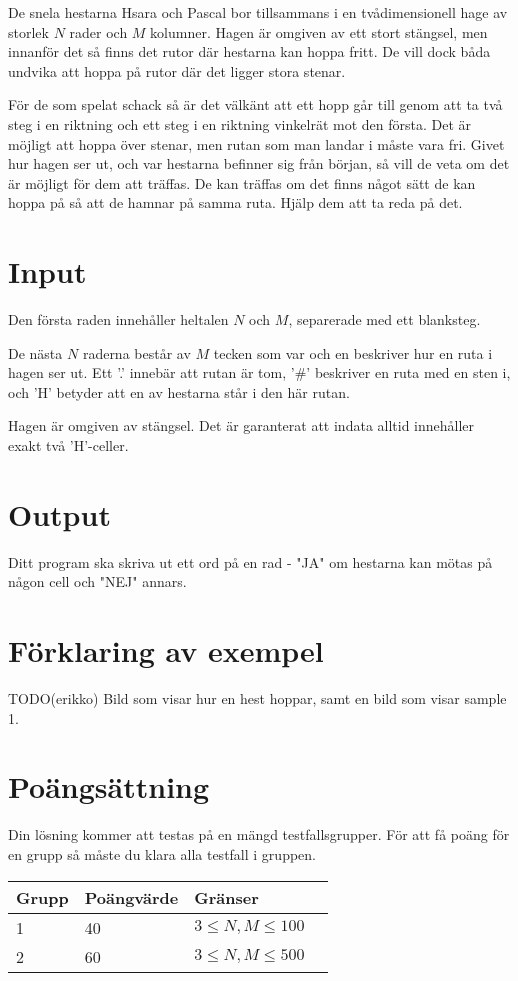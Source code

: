 De snela hestarna Hsara och Pascal bor tillsammans i en tvådimensionell hage av
storlek $N$ rader och $M$ kolumner. Hagen är omgiven av ett stort stängsel, men
innanför det så finns det rutor där hestarna kan hoppa fritt. De vill dock båda
undvika att hoppa på rutor där det ligger stora stenar.

För de som spelat schack så är det välkänt att ett hopp går till genom att ta
två steg i en riktning och ett steg i en riktning vinkelrät mot den första. Det
är möjligt att hoppa över stenar, men rutan som man landar i måste vara fri.
Givet hur hagen ser ut, och var hestarna befinner sig från början, så vill de
veta om det är möjligt för dem att träffas. De kan träffas om det finns något
sätt de kan hoppa på så att de hamnar på samma ruta. Hjälp dem att ta reda på
det.

\section*{Input}
Den första raden innehåller heltalen $N$ och $M$, separerade med ett blanksteg.

De nästa $N$ raderna består av $M$ tecken som var och en beskriver hur en ruta
i hagen ser ut. Ett '.' innebär att rutan är tom, '\#' beskriver en ruta med en
sten i, och 'H' betyder att en av hestarna står i den här rutan.

Hagen är omgiven av stängsel. Det är garanterat att indata alltid innehåller
exakt två 'H'-celler.

\section*{Output}
Ditt program ska skriva ut ett ord på en rad - "JA" om hestarna kan mötas på
någon cell och "NEJ" annars.

\section*{Förklaring av exempel}
TODO(erikko) Bild som visar hur en hest hoppar, samt en bild som visar sample
1.

\section*{Poängsättning}
Din lösning kommer att testas på en mängd testfallsgrupper. För att få poäng
för en grupp så måste du klara alla testfall i gruppen.

\begin{tabular}{| l | l | l | l |}
\hline
Grupp & Poängvärde & Gränser \\ \hline
1 & 40 & $3 \le N,M \le 100$ \\ \hline
2 & 60 & $3 \le N,M \le 500$ \\ \hline
\end{tabular}
